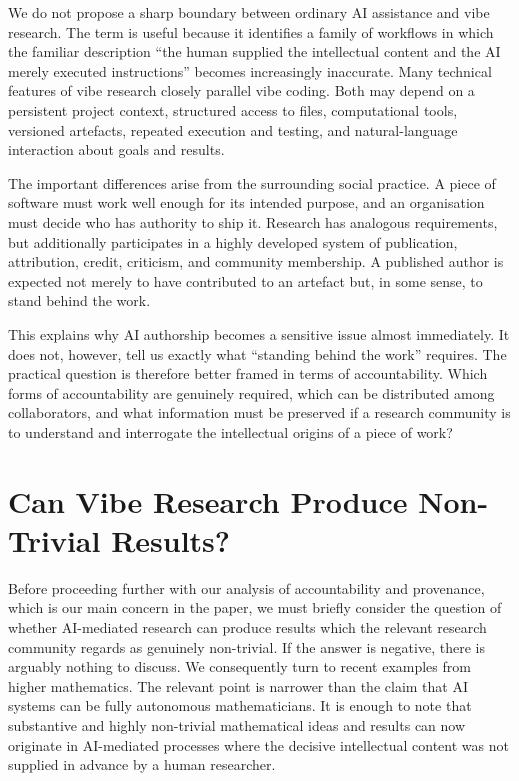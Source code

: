 \documentclass[12pt]{article}
\begin{document}
We do not propose a sharp boundary between ordinary AI assistance and vibe research. The term is useful because it identifies a family of workflows in which the familiar description ``the human supplied the intellectual content and the AI merely executed instructions'' becomes increasingly inaccurate.
Many technical features of vibe research closely parallel vibe coding. Both may depend on a persistent project context, structured access to files, computational tools, versioned artefacts, repeated execution and testing, and natural-language interaction about goals and results.

The important differences arise from the surrounding social practice.
A piece of software must work well enough for its intended purpose, and an organisation must decide who has authority to ship it. Research has analogous requirements, but additionally participates in a highly developed system of publication, attribution, credit, criticism, and community membership. A published author is expected not merely to have contributed to an artefact but, in some sense, to stand behind the work.

This explains why AI authorship becomes a sensitive issue almost immediately. It does not, however, tell us exactly what ``standing behind the work'' requires.
The practical question is therefore better framed in terms of accountability. Which forms of accountability are genuinely required, which can be distributed among collaborators, and what information must be preserved if a research community is to understand and interrogate the intellectual origins of a piece of work?

\section{Can Vibe Research Produce Non-Trivial Results?}

Before proceeding further with our analysis of accountability and provenance, which is our main concern in the paper, we must briefly consider the question of whether AI-mediated research can produce results which the relevant research community regards as genuinely non-trivial. If the answer is negative, there is arguably nothing to discuss. We consequently turn to recent examples from higher mathematics.
The relevant point is narrower than the claim that AI systems can be fully autonomous mathematicians. It is enough to note that substantive and highly non-trivial mathematical ideas and results can now originate in AI-mediated processes where the decisive intellectual content was not supplied in advance by a human researcher.
\end{document}
